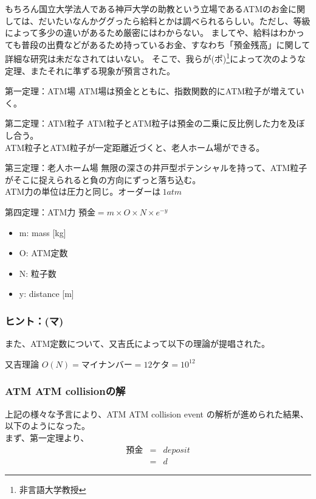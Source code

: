 もちろん国立大学法人である神戸大学の助教という立場であるATMのお金に関しては、だいたいなんかググったら給料とかは調べられるらしい。ただし、等級によって多少の違いがあるため厳密にはわからない。%
ましてや、給料はわかっても普段の出費などがあるため持っているお金、すなわち「預金残高」に関して詳細な研究は未だなされてはいない。
そこで、我らが(ポ)\footnote{非言語大学教授}によって次のような定理、またそれに準ずる現象が預言された。




\begin{itembox}[c]{第一定理：ATM場}
ATM場は預金とともに、指数関数的にATM粒子が増えていく。
\end{itembox}

\begin{itembox}[c]{第二定理：ATM粒子}
ATM粒子とATM粒子は預金の二乗に反比例した力を及ぼし合う。\\
ATM粒子とATM粒子が一定距離近づくと、老人ホーム場ができる。
\end{itembox}

\begin{itembox}[c]{第三定理：老人ホーム場}
無限の深さの井戸型ポテンシャルを持って、ATM粒子がそこに捉えられると負の方向にずっと落ち込む。\\
ATM力の単位は圧力と同じ。オーダーは$~1 atm$
\end{itembox}

\begin{itembox}[c]{第四定理：ATM力}
$預金=m\times O \times N \times e ^{ -y }$
\begin{itemize}
\item m: mass [kg]
\item O: ATM定数
\item N: 粒子数
\item y: distance [m]
\end{itemize}
\end{itembox}

\newpage
\subsubsection{ヒント：(マ)}
\label{mata}
また、ATM定数について、又吉氏によって以下の理論が提唱された。
\begin{itembox}[c]{又吉理論}
$O(N) = マイナンバー = 12ケタ = 10^{12}$
\end{itembox}

\subsubsection{ATM ATM collisionの解}
上記の様々な予言により、ATM ATM collision event の解析が進められた結果、以下のようになった。\\
まず、第一定理より、
\begin{eqnarray}
預金 &=& deposit\nonumber\\
&=& d
\end{eqnarray}

